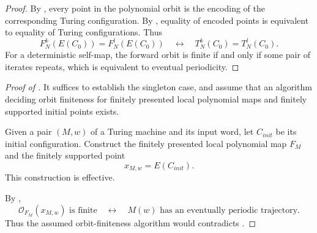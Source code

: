 \documentclass{amsart}
\theoremstyle{definition}
\theoremstyle{remark}
\numberwithin{equation}{section}
\begin{document}
\begin{proof}
By , every point in the polynomial orbit is the encoding of the corresponding Turing configuration.
By , equality of encoded points is equivalent to equality of Turing configurations.
Thus
\[F^k_N(E(C_0))=F^l_N(E(C_0))\quad\longleftrightarrow\quad T^k_N(C_0)=T^l_N(C_0).\]
For a deterministic self-map, the forward orbit is finite if and only if some pair of iterates repeats, which is equivalent to eventual periodicity.
\end{proof}

\begin{proof}[Proof of ]
It suffices to establish the singleton case, and assume that an algorithm deciding orbit finiteness for finitely presented local polynomial maps and finitely supported initial points exists.

Given a pair $(M,w)$ of a Turing machine and its input word, let $C_{init}$ be its initial configuration.
Construct the finitely presented local polynomial map $F_M$ and the finitely supported point
\[x_{M,w}=E(C_{init}).\]
This construction is effective.

By ,
\[\mathcal{O}_{F_M}(x_{M,w})\text{ is finite}\quad\longleftrightarrow\quad M(w)\text{ has an eventually periodic trajectory}.\]
Thus the assumed orbit-finiteness algorithm would contradicts .
\end{proof}




\end{document}
